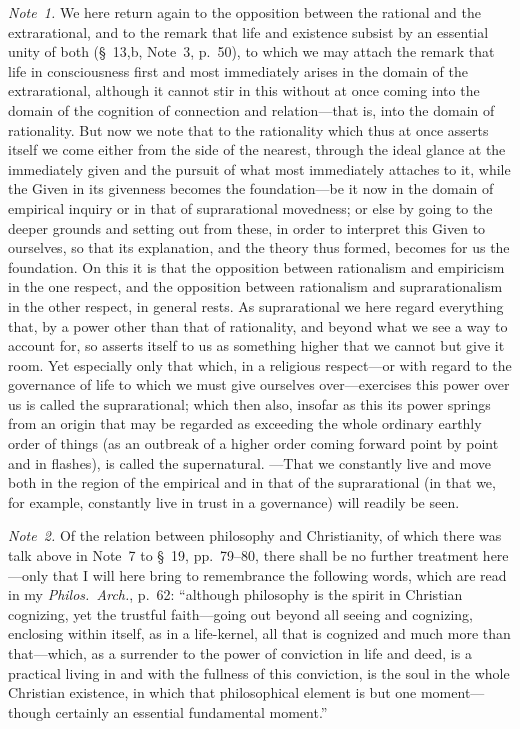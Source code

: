 \documentclass[12pt,a4paper]{book}
\begin{document}
{\small\emph{Note~1.} We here return again to the opposition between the rational and
the extrarational, and to the remark that life and existence subsist by an essential
unity of both (\S~13,b, Note~3, p.~50), to which we may attach the remark that life in
consciousness first and most immediately arises in the domain of the extrarational,
although it cannot stir in this without at once coming into the domain of the cognition
of connection and relation---that is, into the domain of rationality. But now we note
that to the rationality which thus at once asserts itself we come either from the side
of the nearest, through the ideal glance at the immediately given and the pursuit of
what most immediately attaches to it, while the Given in its givenness becomes the
foundation---be it now in the domain of empirical inquiry or in that of suprarational
movedness; or else by going to the deeper grounds and setting out from these, in order
to interpret this Given to ourselves, so that its explanation, and the theory thus
formed, becomes for us the foundation. On this it is that the opposition between
rationalism and empiricism in the one respect, and the opposition between rationalism
and suprarationalism in the other respect, in general rests. As suprarational we here
regard everything that, by a power other than that of rationality, and beyond what we
see a way to account for, so asserts itself to us as something higher that we cannot
but give it room. Yet especially only that which, in a religious respect---or with
regard to the governance of life to which we must give ourselves over---exercises this
power over us is called the suprarational; which then also, insofar as this its power
springs from an origin that may be regarded as exceeding the whole ordinary earthly
order of things (as an outbreak of a higher order coming forward point by point and in
flashes), is called the supernatural. ---That we constantly live and move both in the
region of the empirical and in that of the suprarational (in that we, for example,
constantly live in trust in a governance) will readily be seen.\par}

{\small\emph{Note~2.} Of the relation between philosophy and Christianity, of which
there was talk above in Note~7 to \S~19, pp.~79--80, there shall be no further treatment
here---only that I will here bring to remembrance the following words, which are read in
my \textit{Philos.\ Arch.}, p.~62: ``although philosophy is the spirit in Christian
cognizing, yet the trustful faith---going out beyond all seeing and cognizing, enclosing
within itself, as in a life-kernel, all that is cognized and much more than that---which,
as a surrender to the power of conviction in life and deed, is a practical living in and
with the fullness of this conviction, is the soul in the whole Christian existence, in
which that philosophical element is but one moment---though certainly an essential
fundamental moment.''\par}
\end{document}
